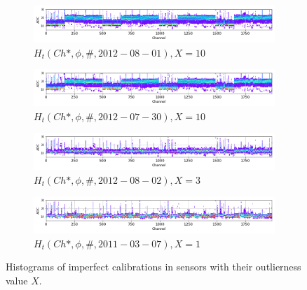 \begin{figure}

    \begin{subfigure}[b]{\textwidth}
    \centering
    \includegraphics[width=0.9\linewidth]{figures/chapter4/calib_analysis/P2-all-bad-cals-phi-0.png}
    \caption{$H_t(Ch*, \phi, \#, 2012-08-01), X=10$}
    \label{plot:all-bad-phi-0}
  \end{subfigure}


    \begin{subfigure}[b]{\textwidth}
    \centering
    \includegraphics[width=0.9\linewidth]{figures/chapter4/calib_analysis/P2-all-bad-cals-phi-1.png}
    \caption{$H_t(Ch*, \phi, \#, 2012-07-30), X=10$}
    \label{plot:all-bad-phi-1}
  \end{subfigure}


    \begin{subfigure}[b]{\textwidth}
    \centering
    \includegraphics[width=0.9\linewidth]{figures/chapter4/calib_analysis/P2-all-bad-cals-phi-2.png}
    \caption{$H_t(Ch*, \phi, \#, 2012-08-02), X=3$}
    \label{plot:all-bad-phi-2}
  \end{subfigure}


    \begin{subfigure}[b]{\textwidth}
    \centering
    \includegraphics[width=0.9\linewidth]{figures/chapter4/calib_analysis/P2-all-bad-cals-phi-3.png}
    \caption{$H_t(Ch*, \phi, \#, 2011-03-07), X=1$}
    \label{plot:all-bad-phi-3}
  \end{subfigure}
    \caption{Histograms of imperfect calibrations in \phi sensors with their outlierness value $X$.}
    \label{plot:all-bad-phi}
\end{figure}


